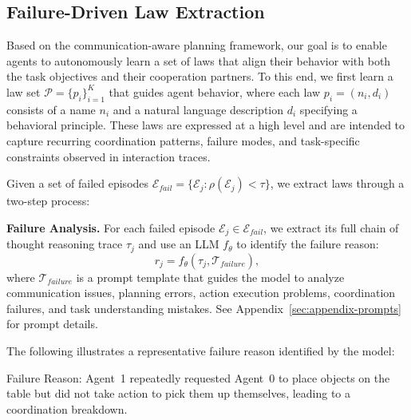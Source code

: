 \documentclass{article}
\theoremstyle{plain}
\theoremstyle{definition}
\theoremstyle{remark}
\begin{document}
\subsection{Failure-Driven Law Extraction}

Based on the communication-aware planning framework, our goal is to enable agents to autonomously learn a set of laws that align their behavior with both the task objectives and their cooperation partners. To this end, we first learn a law set $\mathcal{P} = \{p_i\}_{i=1}^K$ that guides agent behavior, where each law $p_i = (n_i, d_i)$ consists of a name $n_i$ and a natural language description $d_i$ specifying a behavioral principle. These laws are expressed at a high level and are intended to capture recurring coordination patterns, failure modes, and task-specific constraints observed in interaction traces.

Given a set of failed episodes $\mathcal{E}_{fail} = \{\mathcal{E}_j : \rho(\mathcal{E}_j) < \tau\}$, we extract laws through a two-step process:

\textbf{Failure Analysis.} For each failed episode $\mathcal{E}_j \in \mathcal{E}_{fail}$, we extract its full chain of thought reasoning trace $\tau_j$ and use an LLM $f_\theta$ to identify the failure reason:
\begin{equation}
r_j = f_\theta(\tau_j, \mathcal{T}_{failure}),
\end{equation}
where $\mathcal{T}_{failure}$ is a prompt template that guides the model to analyze communication issues, planning errors, action execution problems, coordination failures, and task understanding mistakes. See Appendix~\ref{sec:appendix-prompts} for prompt details.

The following illustrates a representative failure reason identified by the model:
\begin{mdframed}[linewidth=0.8pt, roundcorner=4pt, innerleftmargin=6pt, innerrightmargin=6pt, innertopmargin=6pt, innerbottommargin=6pt]
Failure Reason: Agent~1 repeatedly requested Agent~0 to place objects on the table but did not take action to pick them up themselves, leading to a coordination breakdown.
\end{mdframed}
\end{document}
